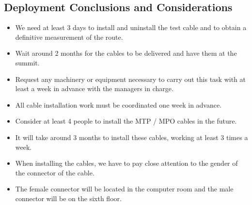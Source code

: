   \subsection{Deployment Conclusions and Considerations}
  \begin{itemize}
    \item We need at least 3 days to install and uninstall the test cable and to obtain a definitive measurement of the route.
    \item Wait around 2 months for the cables to be delivered and have them at the summit.
    \item Request any machinery or equipment necessary to carry out this task with at least a week in advance with the managers in charge. 
    \item All cable installation work must be coordinated one week in advance.
    \item Consider at least 4 people to install the MTP / MPO cables in the future.
    \item It will take around 3 months to install these cables, working at least 3 times a week.
    \item When installing the cables, we have to pay close attention to the gender of the connector of the cable.
    \item The female connector will be located in the computer room and the male connector will be on the sixth floor.
  \end{itemize}














  









